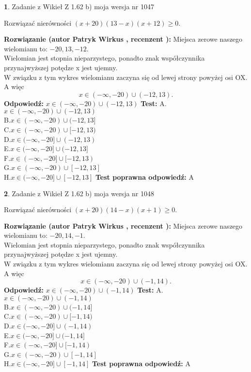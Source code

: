 \documentclass[12pt, a4paper]{article}
\theoremstyle{definition} %
\newtheorem{zad}{}
\newcommand{\zadStart}[1]{\begin{zad}#1\newline}
\newcommand{\zadStop}{\end{zad}}
\newcommand{\rozwStart}[2]{\noindent \textbf{Rozwiązanie (autor #1 , recenzent #2): }\newline}
\newcommand{\rozwStop}{\newline}
\newcommand{\odpStart}{\noindent \textbf{Odpowiedź:}\newline}
\newcommand{\odpStop}{\newline}
\newcommand{\testStart}{\noindent \textbf{Test:}\newline}
\newcommand{\testStop}{\newline}
\newcommand{\kluczStart}{\noindent \textbf{Test poprawna odpowiedź:}\newline}
\newcommand{\kluczStop}{\newline}
\begin{document}
\zadStart{Zadanie z Wikieł Z 1.62 b) moja wersja nr 1047}

Rozwiązać nierówności $(x+20)(13-x)(x+12)\ge0$.
\zadStop
\rozwStart{Patryk Wirkus}{}
Miejsca zerowe naszego wielomianu to: $-20, 13, -12$.\\
Wielomian jest stopnia nieparzystego, ponadto znak współczynnika przy\linebreak najwyższej potędze x jest ujemny.\\ W związku z tym wykres wielomianu zaczyna się od lewej strony powyżej osi OX. A więc $$x \in (-\infty,-20) \cup (-12,13).$$
\rozwStop
\odpStart
$x \in (-\infty,-20) \cup (-12,13)$
\odpStop
\testStart
A.$x \in (-\infty,-20) \cup (-12,13)$\\
B.$x \in (-\infty,-20) \cup (-12,13]$\\
C.$x \in (-\infty,-20) \cup [-12,13)$\\
D.$x \in (-\infty,-20] \cup (-12,13)$\\
E.$x \in (-\infty,-20] \cup (-12,13]$\\
F.$x \in (-\infty,-20] \cup [-12,13)$\\
G.$x \in (-\infty,-20) \cup [-12,13]$\\
H.$x \in (-\infty,-20] \cup [-12,13]$
\testStop
\kluczStart
A
\kluczStop



\zadStart{Zadanie z Wikieł Z 1.62 b) moja wersja nr 1048}

Rozwiązać nierówności $(x+20)(14-x)(x+1)\ge0$.
\zadStop
\rozwStart{Patryk Wirkus}{}
Miejsca zerowe naszego wielomianu to: $-20, 14, -1$.\\
Wielomian jest stopnia nieparzystego, ponadto znak współczynnika przy\linebreak najwyższej potędze x jest ujemny.\\ W związku z tym wykres wielomianu zaczyna się od lewej strony powyżej osi OX. A więc $$x \in (-\infty,-20) \cup (-1,14).$$
\rozwStop
\odpStart
$x \in (-\infty,-20) \cup (-1,14)$
\odpStop
\testStart
A.$x \in (-\infty,-20) \cup (-1,14)$\\
B.$x \in (-\infty,-20) \cup (-1,14]$\\
C.$x \in (-\infty,-20) \cup [-1,14)$\\
D.$x \in (-\infty,-20] \cup (-1,14)$\\
E.$x \in (-\infty,-20] \cup (-1,14]$\\
F.$x \in (-\infty,-20] \cup [-1,14)$\\
G.$x \in (-\infty,-20) \cup [-1,14]$\\
H.$x \in (-\infty,-20] \cup [-1,14]$
\testStop
\kluczStart
A
\kluczStop
\end{document}
